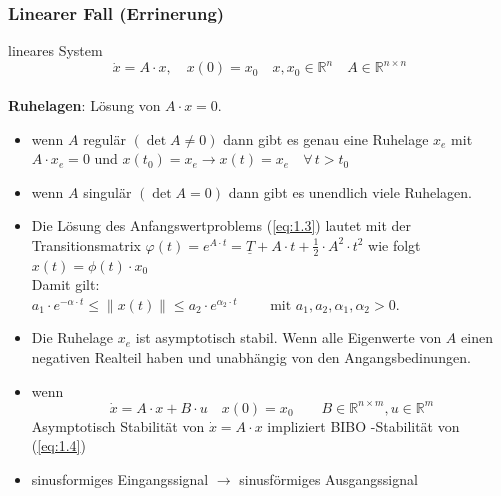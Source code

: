 \documentclass[ngerman]{tudscrreprt}
\begin{document}
\subsubsection{Linearer Fall (Errinerung)}
lineares System 
\begin{equation*}\dot{x} = A\cdot x , \quad x(0) = x_{0} \quad x, x_{0} \in \mathbb{R}^{n}\quad A  \in \mathbb{R}^{n\times n}
\tag{1.3}
\label{eq:1.3}
\end{equation*} 
\\
\textbf{Ruhelagen}: Lösung von $A\cdot x = 0.$\\
\begin{itemize}
\item wenn $A$ regulär $(\det A\ne 0)$ dann gibt es genau eine Ruhelage $x_{e}$ mit $A\cdot x_{e}=0$ und $x(t_{0})=x_{e} \rightarrow x(t)=x_{e} \quad \forall \, t > t_{0}$
\item wenn $A$ singulär $(\det{A} = 0)$ dann gibt es unendlich viele Ruhelagen.
\item Die Lösung des Anfangswertproblems (\ref{eq:1.3}) lautet mit der\\ Transitionsmatrix $\varphi(t)=e^{A\cdot t} = \underline{T} + A\cdot t + \frac{1}{2} \cdot A^2 \cdot t^2 $ wie folgt 
$x(t) = \phi(t)\cdot x_{0}$ \\ Damit gilt:\\ $a_{1}\cdot e^{-\alpha \cdot t} \leq \parallel x(t) \parallel \leq a_{2}\cdot e^{\alpha_{2} \cdot t} \qquad \text{ mit }a_{1}, a_{2}, \alpha_{1}, \alpha_{2} > 0.$
\item Die Ruhelage $x_{e}$ ist asymptotisch stabil. Wenn alle Eigenwerte von $A$ einen negativen Realteil haben und unabhängig von den Angangsbedinungen.
\item wenn 
\begin{equation}
\dot{x} = A\cdot x + B\cdot u \quad x(0) = x_{0}
\qquad B \in \mathbb{R}^{n\times m}, u \in \mathbb{R}^{m}
\tag{1.4}
\label{eq:1.4}
\end{equation}
Asymptotisch Stabilität von $\dot{x}= A\cdot x $ impliziert BIBO -Stabilität von (\ref{eq:1.4})
\item sinusformiges Eingangssignal $\rightarrow$ sinusförmiges Ausgangssignal
\end{itemize}
\end{document}
